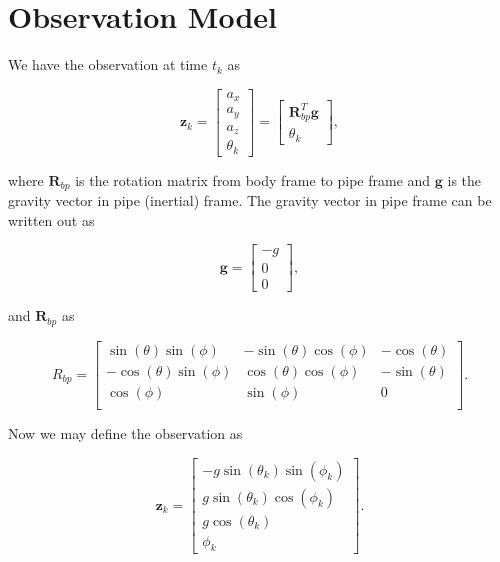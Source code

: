 \documentclass[12pt]{article}
\begin{document}
\section{Observation Model}\label{sec:obs-model}

We have the observation at time $t_k$ as

\begin{equation}
	\mathbf{z}_k = 
		\begin{bmatrix}
			a_x \\
			a_y \\
			a_z \\
			\theta_k 
		\end{bmatrix}
		=
	\begin{bmatrix}
		\mathbf{R}^T_{bp}\mathbf{g} \\
		\theta_k 
	\end{bmatrix},
\end{equation}

where $\mathbf{R}_{bp}$ is the rotation matrix from body frame to pipe frame and $\mathbf{g}$ is the gravity vector in pipe (inertial) frame. The gravity vector in pipe frame can be written out as

\begin{equation}
\mathbf{g} = 
\begin{bmatrix}
-g \\
 0\\
 0
\end{bmatrix},
\end{equation}

and $\mathbf{R}_{bp}$ as

\begin{equation}
 R_{bp} = 
 \begin{bmatrix}
 \sin(\theta)\sin(\phi) & -\sin(\theta)\cos(\phi) & -\cos(\theta) \\
 -\cos(\theta)\sin(\phi)& \cos(\theta)\cos(\phi)  & -\sin(\theta) \\
 \cos(\phi)             & \sin(\phi)              & 0 \\
 \end{bmatrix}.
\end{equation}

Now we may define the observation as

\begin{equation}
	\mathbf{z}_k = 
	\begin{bmatrix}
	-g \sin(\theta_k) \sin(\phi_k) \\
	g \sin(\theta_k) \cos(\phi_k) \\
	g \cos(\theta_k) \\
	\phi_k
	\end{bmatrix}.
\end{equation}
\end{document}
